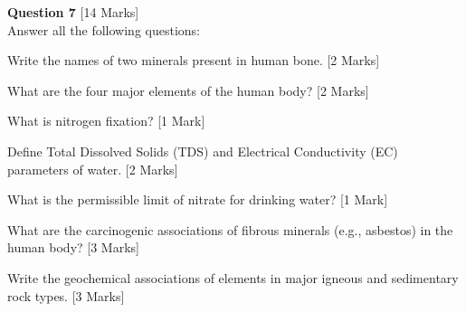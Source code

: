 \documentclass[11pt,a4paper]{article}
\begin{document}
\noindent   \textbf{Question 7} \hfill [14 Marks]\\
Answer all the following questions:

\begin{parts}
  \item Write the names of two minerals present in human bone. \hfill [2 Marks]
  \item What are the four major elements of the human body? \hfill [2 Marks]
  \item What is nitrogen fixation? \hfill [1 Mark]
  \item Define Total Dissolved Solids (TDS) and Electrical Conductivity (EC) parameters of water. \hfill [2 Marks]
  \item What is the permissible limit of nitrate for drinking water? \hfill [1 Mark]
  \item What are the carcinogenic associations of fibrous minerals (e.g., asbestos) in the human body? \hfill [3 Marks]
  \item Write the geochemical associations of elements in major igneous and sedimentary rock types. \hfill [3 Marks]
\end{parts}
\end{document}
